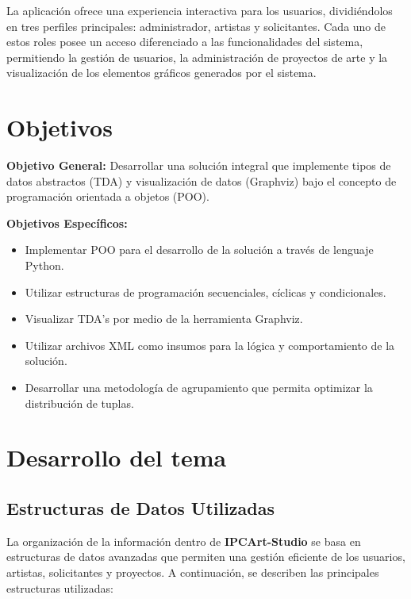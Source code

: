 \documentclass[letterpaper,12pt]{article}
\begin{document}
\begin{multicols}{2}
La aplicaci\'on ofrece una experiencia interactiva para los usuarios, dividi\'endolos en tres perfiles principales: administrador, artistas y solicitantes. Cada uno de estos roles posee un acceso diferenciado a las funcionalidades del sistema, permitiendo la gesti\'on de usuarios, la administraci\'on de proyectos de arte y la visualizaci\'on de los elementos gr\'aficos generados por el sistema.



    \section*{Objetivos}
    \textbf{Objetivo General:}
    Desarrollar una solución integral que implemente tipos de datos abstractos (TDA) y visualización de datos (Graphviz) bajo el concepto de programación orientada a objetos (POO).

    \textbf{Objetivos Específicos:}
    \begin{itemize}
        \item Implementar POO para el desarrollo de la solución a través de lenguaje Python.
        \item Utilizar estructuras de programación secuenciales, cíclicas y condicionales.
        \item Visualizar TDA's por medio de la herramienta Graphviz.
        \item Utilizar archivos XML como insumos para la lógica y comportamiento de la solución.
        \item Desarrollar una metodología de agrupamiento que permita optimizar la distribución de tuplas.
    \end{itemize}

    \section*{Desarrollo del tema}
    \subsection*{Estructuras de Datos Utilizadas}
    La organizaci\'on de la informaci\'on dentro de \textbf{IPCArt-Studio} se basa en estructuras de datos avanzadas que permiten una gesti\'on eficiente de los usuarios, artistas, solicitantes y proyectos. A continuaci\'on, se describen las principales estructuras utilizadas:
    

\end{multicols}
\end{document}
